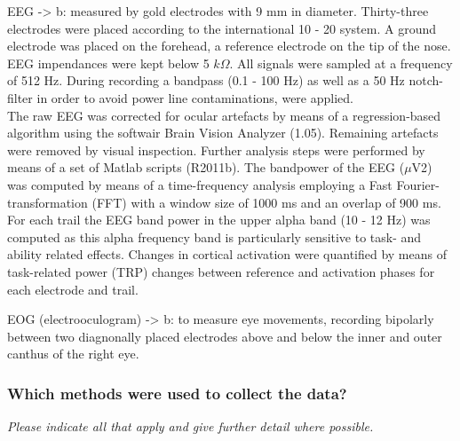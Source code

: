 \documentclass[
  doc, a4paper]{apa7}
\begin{document}
EEG -\textgreater{} b: measured by gold electrodes with 9 mm in diameter. Thirty-three electrodes were placed according to the international 10 - 20 system. A ground electrode was placed on the forehead, a reference electrode on the tip of the nose. EEG impendances were kept below 5 \(k\Omega\). All signals were sampled at a frequency of 512 Hz. During recording a bandpass (0.1 - 100 Hz) as well as a 50 Hz notch-filter in order to avoid power line contaminations, were applied.\\
The raw EEG was corrected for ocular artefacts by means of a regression-based algorithm using the softwair Brain Vision Analyzer (1.05). Remaining artefacts were removed by visual inspection. Further analysis steps were performed by means of a set of Matlab scripts (R2011b). The bandpower of the EEG (\(\mu\)V2) was computed by means of a time-frequency analysis employing a Fast Fourier-transformation (FFT) with a window size of 1000 ms and an overlap of 900 ms. For each trail the EEG band power in the upper alpha band (10 - 12 Hz) was computed as this alpha frequency band is particularly sensitive to task- and ability related effects. Changes in cortical activation were quantified by means of task-related power (TRP) changes between reference and activation phases for each electrode and trail.

EOG (electrooculogram) -\textgreater{} b: to measure eye movements, recording bipolarly between two diagnonally placed electrodes above and below the inner and outer canthus of the right eye.

\subsubsection{Which methods were used to collect the data?}\label{which-methods-were-used-to-collect-the-data}

\emph{Please indicate all that apply and give further detail where possible.}
\end{document}
